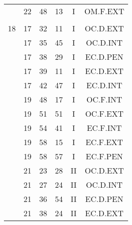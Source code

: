 \documentclass[12pt, a4paper]{article}
\begin{document}
\begin{multicols}{3}
{\begin{tabular}{c c c c c c}
	 	 	 	 & 22 & 48 & 13 & I & OM.F.EXT\\%
	 	 	 	 & & & & & \\%
	 	 	 	18 & 17 & 32 & 11 & I & OC.D.EXT\\%
	 	 	 	 & 17 & 35 & 45 & I & OC.D.INT\\%
	 	 	 	 & 17 & 38 & 29 & I & EC.D.PEN\\%
	 	 	 	 & 17 & 39 & 11 & I & EC.D.EXT\\%
	 	 	 	 & 17 & 42 & 47 & I & EC.D.INT\\%
	 	 	 	 & 19 & 48 & 17 & I & OC.F.INT\\%
	 	 	 	 & 19 & 51 & 51 & I & OC.F.EXT\\%
	 	 	 	 & 19 & 54 & 41 & I & EC.F.INT\\%
	 	 	 	 & 19 & 58 & 15 & I & EC.F.EXT\\%
	 	 	 	 & 19 & 58 & 57 & I & EC.F.PEN\\%
	 	 	 	 & 21 & 23 & 28 & II & OC.D.EXT\\%
	 	 	 	 & 21 & 27 & 24 & II & OC.D.INT\\%
	 	 	 	 & 21 & 36 & 54 & II & EC.D.PEN\\%
	 	 	 	 & 21 & 38 & 24 & II & EC.D.EXT\\%
	 	 \end{tabular}
 	}
\end{multicols}
\end{document}
